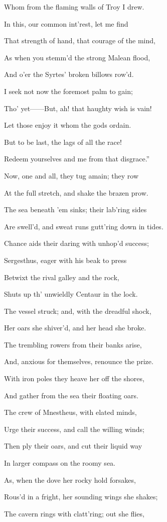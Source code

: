 Whom from the flaming walls of Troy I drew.

In this, our common int’rest, let me find

That strength of hand, that courage of the mind,

As when you stemm’d the strong Malean flood,

And o’er the Syrtes’ broken billows row’d.

I seek not now the foremost palm to gain;

Tho’ yet——But, ah! that haughty wish is vain!

Let those enjoy it whom the gods ordain.

But to be last, the lags of all the race!

Redeem yourselves and me from that disgrace.”

Now, one and all, they tug amain; they row

At the full stretch, and shake the brazen prow.

The sea beneath ’em sinks; their lab’ring sides

Are swell’d, and sweat runs gutt’ring down in tides.

Chance aids their daring with unhop’d success;

Sergesthus, eager with his beak to press

Betwixt the rival galley and the rock,

Shuts up th’ unwieldly Centaur in the lock.

The vessel struck; and, with the dreadful shock,

Her oars she shiver’d, and her head she broke.

The trembling rowers from their banks arise,

And, anxious for themselves, renounce the prize.

With iron poles they heave her off the shores,

And gather from the sea their floating oars.

The crew of Mnestheus, with elated minds,

Urge their success, and call the willing winds;

Then ply their oars, and cut their liquid way

In larger compass on the roomy sea.

As, when the dove her rocky hold forsakes,

Rous’d in a fright, her sounding wings she shakes;

The cavern rings with clatt’ring; out she flies,

